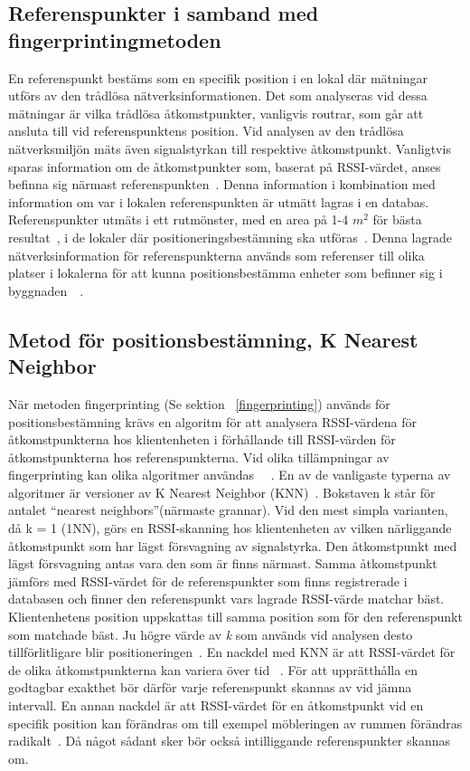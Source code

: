 \documentclass[a4paper,12pt]{article}
\begin{document}
 \subsection{Referenspunkter i samband med fingerprintingmetoden}\label{referenspunkter}
 En referenspunkt bestäms som en specifik position i en lokal där mätningar utförs av den trådlösa nätverksinformationen. Det som analyseras vid dessa mätningar är vilka trådlösa åtkomstpunkter, vanligvis routrar, som går att ansluta till vid referenspunktens position. Vid analysen av den trådlösa nätverksmiljön mäts även signalstyrkan till respektive åtkomstpunkt. Vanligtvis sparas information om de åtkomstpunkter som, baserat på RSSI-värdet, anses befinna sig närmast referenspunkten~\cite{IP1}. Denna information i kombination med information om var i lokalen referenspunkten är utmätt lagras i en databas. Referenspunkter utmäts i ett rutmönster, med en area på 1-4 $m^2$ för bästa resultat~\cite{yiu2017wireless}, i de lokaler där positioneringsbestämning ska utföras~\cite{IP1}. Denna lagrade nätverksinformation för referenspunkterna används som referenser till olika platser i lokalerna för att kunna positionsbestämma enheter som befinner sig i byggnaden~\cite{yiu2017wireless}~\cite{IP1}.


 \subsection{Metod för positionsbestämning, K Nearest Neighbor}\label{KNN}
 När metoden fingerprinting (Se sektion ~\ref{fingerprinting}) används för positionsbestämning krävs en algoritm för att analysera RSSI-värdena för åtkomstpunkterna hos klientenheten i förhållande till RSSI-värden för åtkomstpunkterna hos referenspunkterna. Vid olika tillämpningar av fingerprinting kan olika algoritmer användas ~\cite{tian2013fingerprint}~\cite{jun2018low}. En av de vanligaste typerna av algoritmer är versioner av K Nearest Neighbor (KNN)~\cite{tian2013fingerprint}.
 Bokstaven k står för antalet ``nearest neighbors''(närmaste grannar). Vid den mest simpla varianten, då k = 1 (1NN), görs en RSSI-skanning hos klientenheten av vilken närliggande åtkomstpunkt som har lägst försvagning av signalstyrka. Den åtkomstpunkt med lägst försvagning antas vara den som är finns närmast. Samma åtkomstpunkt jämförs med RSSI-värdet för de referenspunkter som finns registrerade i databasen och finner den referenspunkt vars lagrade RSSI-värde matchar bäst. Klientenhetens position uppskattas till samma position som för den referenspunkt som matchade bäst.
 Ju högre värde av \textit{k} som används vid analysen desto tillförlitligare blir positioneringen~\cite{yiu2017wireless}.
 En nackdel med KNN är att RSSI-värdet för de olika åtkomstpunkterna kan variera över tid ~\cite{tian2013fingerprint}. För att upprätthålla en godtagbar exakthet bör därför varje referenspunkt skannas av vid jämna intervall.
 En annan nackdel är att RSSI-värdet för en åtkomstpunkt vid en specifik position kan förändras om till exempel möbleringen av rummen förändras radikalt~\cite{zanca2008experimental}. Då något sådant sker bör också intilliggande referenspunkter skannas om.
\end{document}

